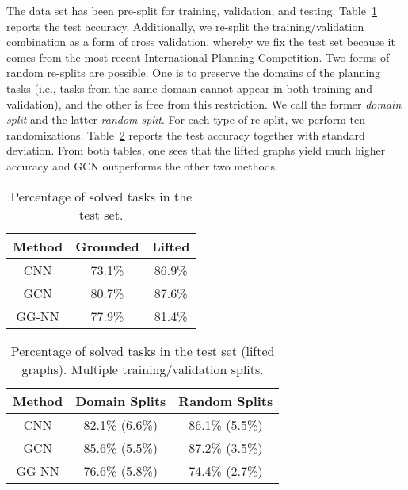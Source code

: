 \documentclass{article}
\begin{document}
The data set has been pre-split for training, validation, and testing. Table~\ref{tab:planning.results} reports the test accuracy. Additionally, we re-split the training/validation combination as a form of cross validation, whereby we fix the test set because it comes from the most recent International Planning Competition. Two forms of random re-splits are possible. One is to preserve the domains of the planning tasks (i.e., tasks from the same domain cannot appear in both training and validation), and the other is free from this restriction. We call the former \emph{domain split} and the latter \emph{random split}. For each type of re-split, we perform ten randomizations. Table~\ref{tab:planning.results2} reports the test accuracy together with standard deviation. From both tables, one sees that the lifted graphs yield much higher accuracy and GCN outperforms the other two methods.

\begin{table}[ht]
\centering
\caption{Percentage of solved tasks in the test set.}
\label{tab:planning.results}
\begin{tabular}{ccc}
\hline
Method & Grounded & Lifted \\
\hline
CNN   & 73.1\% & 86.9\% \\
GCN   & 80.7\% & 87.6\% \\
GG-NN & 77.9\% & 81.4\% \\
\hline
\end{tabular}
\end{table}

\begin{table}[ht]
\centering
\caption{Percentage of solved tasks in the test set (lifted graphs). Multiple training/validation splits.}
\label{tab:planning.results2}
\begin{tabular}{ccc}
\hline
Method & Domain Splits & Random Splits\\
\hline
CNN   & 82.1\% (6.6\%) & 86.1\% (5.5\%)\\
GCN   & 85.6\% (5.5\%) & 87.2\% (3.5\%)\\
GG-NN & 76.6\% (5.8\%) & 74.4\% (2.7\%)\\
\hline
\end{tabular}
\end{table}
\end{document}
